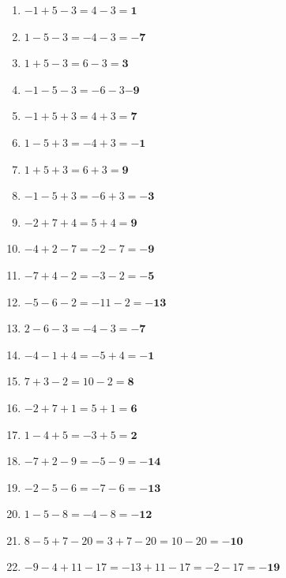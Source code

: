 \documentclass[a4paper,10pt]{article} %
\begin{document}
\begin{enumerate}

  \item \(-1 + 5 - 3 =
    4 - 3 =
    \mathbf{1}\) %

  \item \(1 - 5 - 3 =
    -4 - 3 =
    \mathbf{-7}\) %

  \item \(1 + 5 - 3 =
    6 - 3 =
    \mathbf{3}\) %

  \item \(-1 - 5 - 3 =
    -6 - 3
    \mathbf{-9}\) %

  \item \(-1 + 5 + 3 =
    4 + 3 =
    \mathbf{7}\) %

  \item \(1 - 5 + 3 =
    -4 + 3 =
    \mathbf{-1}\) %

  \item \(1 + 5 + 3 =
    6 + 3 =
    \mathbf{9}\) %

  \item \(-1 - 5 + 3 =
    -6 + 3 =
    \mathbf{-3}\) %

  \item \(-2 + 7 + 4 =
    5 + 4 =
    \mathbf{9}\) %

  \item \(-4 + 2 - 7 =
    -2 - 7 =
    \mathbf{-9}\) %

  \item \(-7 + 4 - 2 =
    -3 - 2 =
    \mathbf{-5}\) %

  \item \(-5 - 6 - 2 =
    -11 - 2 =
    \mathbf{-13}\) %

  \item \(2 - 6 - 3 =
    -4 - 3 =
    \mathbf{-7}\) %

  \item \(-4 - 1 + 4 =
    -5 + 4 =
    \mathbf{-1}\) %

  \item \(7 + 3 - 2 =
    10 - 2 =
    \mathbf{8}\) %

  \item \(-2 + 7 + 1 =
    5 + 1 =
    \mathbf{6}\) %

  \item \(1 - 4 + 5 =
    -3 + 5 =
    \mathbf{2}\) %

  \item \(-7 + 2 - 9 =
    -5 - 9 =
    \mathbf{-14}\) %

  \item \(-2 - 5 - 6 =
    -7 - 6 =
    \mathbf{-13}\) %

  \item \(1 - 5 - 8 =
    -4 - 8 =
    \mathbf{-12}\) %

  \item \(8 - 5 + 7 - 20 =
    3 + 7 - 20 =
    10 - 20 =
    \mathbf{-10}\) %

  \item \(-9 - 4 + 11 - 17 =
    -13 + 11 - 17 =
    -2 - 17 =
    \mathbf{-19}\) %

\end{enumerate}
\end{document}

